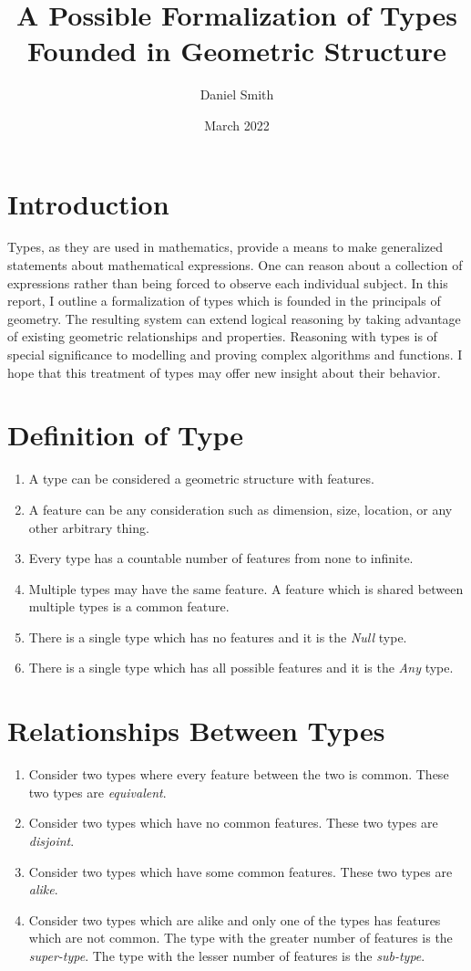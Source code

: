 \documentclass{article}
\title{A Possible Formalization of Types Founded in Geometric Structure}
\author{Daniel Smith}
\date{March 2022}
\begin{document}
\maketitle

\section*{Introduction}
Types, as they are used in mathematics, provide a means to make generalized statements about mathematical expressions.
One can reason about a collection of expressions rather than being forced to observe each individual subject.
In this report, I outline a formalization of types which is founded in the principals of geometry.
The resulting system can extend logical reasoning by taking advantage of existing geometric relationships and properties.
Reasoning with types is of special significance to modelling and proving complex algorithms and functions.
I hope that this treatment of types may offer new insight about their behavior.

\section*{Definition of Type}

\begin{enumerate}
    \item A type can be considered a geometric structure with features.
    \item A feature can be any consideration such as dimension, size, location, or any other arbitrary thing.
    \item Every type has a countable number of features from none to infinite.
    \item Multiple types may have the same feature. A feature which is shared between multiple types is a common feature.
    \item There is a single type which has no features and it is the \textit{Null} type.
    \item There is a single type which has all possible features and it is the \textit{Any} type.
\end{enumerate}

\section*{Relationships Between Types}
\begin{enumerate}
    \item Consider two types where every feature between the two is common. These two types are \textit{equivalent}.
    \item Consider two types which have no common features. These two types are \textit{disjoint}.
    \item Consider two types which have some common features. These two types are \textit{alike}.
    \item Consider two types which are alike and only one of the types has features which are not common. The type with the greater number of features is the \textit{super-type}. The type with the lesser number of features is the \textit{sub-type}.
\end{enumerate}
\end{document}

